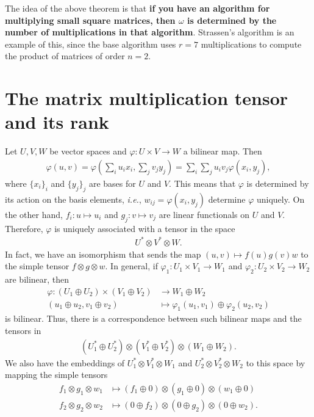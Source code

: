 \documentclass{article}
\theoremstyle{plain}
\theoremstyle{definition}
\theoremstyle{remark}
\begin{document}
The idea of the above theorem is that \textbf{if you have an algorithm for multiplying small square matrices, then $\omega$ is determined by the number of multiplications in that algorithm}. Strassen's algorithm is an example of this, since the base algorithm uses $r = 7$ multiplications to compute the product of matrices of order $n = 2$.

\newpage
\section{The matrix multiplication tensor and its rank}

Let $U, V, W$ be vector spaces and $\varphi \colon U \times V \to W$ a bilinear map. Then
\begin{align*}
    \varphi(u, v) = \varphi(\sum_{i} u_i x_i, \sum_{j} v_j y_j) = \sum_{i}\sum_{j} u_i v_j \varphi(x_i, y_j),
\end{align*}
where $\{x_i\}_i$ and $\{y_j\}_j$ are bases for $U$ and $V$. This means that $\varphi$ is determined by its action on the basis elements, \emph{i.e.}, $w_{ij} = \varphi(x_i, y_j)$ determine $\varphi$ uniquely. On the other hand, $f_i \colon u \mapsto u_i$ and $g_j \colon v \mapsto v_j$ are linear functionals on $U$ and $V$. Therefore, $\varphi$ is uniquely associated with a tensor in the space
\begin{align*}
    U^* \otimes V^* \otimes W.
\end{align*}
In fact, we have an isomorphism that sends the map $(u, v) \mapsto f(u)g(v)w$ to the simple tensor $f \otimes g \otimes w$. In general, if $\varphi_1 \colon U_1 \times V_1 \to W_1$ and $\varphi_2 \colon U_2 \times V_2 \to W_2$ are bilinear, then
\begin{align*}
    \varphi \colon (U_1 \oplus U_2) \times (V_1 \oplus V_2) &\to W_1 \oplus W_2 \\
    (u_1 \oplus u_2, v_1 \oplus v_2) &\mapsto \varphi_1(u_1, v_1) \oplus \varphi_2(u_2, v_2)
\end{align*}
is bilinear. Thus, there is a correspondence between such bilinear maps and the tensors in
\begin{align*}
    (U_1^* \oplus U_2^*) \otimes (V_1^* \oplus V_2^*) \otimes (W_1 \oplus W_2).
\end{align*}
We also have the embeddings of $U_1^* \otimes V_1^* \otimes W_1$ and $U_2^* \otimes V_2^* \otimes W_2$ to this space by mapping the simple tensors
\begin{align*}
    f_1 \otimes g_1 \otimes w_1 &\mapsto (f_1 \oplus 0) \otimes (g_1 \oplus 0) \otimes (w_1 \oplus 0) \\
    f_2 \otimes g_2 \otimes w_2 &\mapsto (0 \oplus f_2) \otimes (0 \oplus g_2) \otimes (0 \oplus w_2).
\end{align*}
\end{document}
